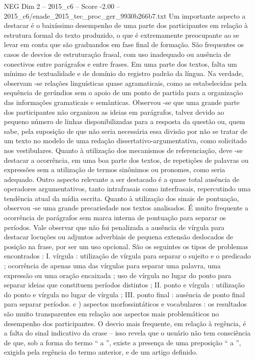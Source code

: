 \begin{textsample}{NEG Dim 2 – 2015\_c6 – Score -2.00 – 2015\_c6/enade\_2015\_tec\_proc\_ger\_9930b266b7.txt}
Um importante aspecto a destacar é o baixíssimo desempenho de uma parte dos participantes em relação à estrutura formal do texto produzido, o que é extremamente preocupante ao se levar em conta que são graduandos em fase final de formação.
São frequentes os casos de desvios de estruturação frasal, com uso inadequado ou ausência de conectivos entre parágrafos e entre frases.
Em uma parte dos textos, falta um mínimo de textualidade e de domínio do registro padrão da língua.
Na verdade, observam -se relações linguísticas quase agramaticais, como as estabelecidas pela sequência de gerúndios sem o apoio de um ponto de partida para a organização das informações gramaticais e semânticas.
Observou -se que uma grande parte dos participantes não organizou as ideias em parágrafos, talvez devido ao pequeno número de linhas disponibilizadas para a resposta da questão ou, quem sabe, pela suposição de que não seria necessária essa divisão por não se tratar de um texto no modelo de uma redação dissertativo-argumentativa, como solicitado nos vestibulares.
Quanto à utilização dos mecanismos de referenciação, deve -se destacar a ocorrência, em uma boa parte dos textos, de repetições de palavras ou expressões sem a utilização de termos sinônimos ou pronomes, como seria adequado.
Outro aspecto relevante a ser destacado é a quase total ausência de operadores argumentativos, tanto intrafrasais como interfrasais, repercutindo uma tendência atual da mídia escrita.
Quanto à utilização dos sinais de pontuação, observou -se uma grande precariedade nos textos analisados.
É muito frequente a ocorrência de parágrafos sem marca interna de pontuação para separar os períodos.
Vale observar que não foi penalizada a ausência de vírgula para destacar locuções ou adjuntos adverbiais de pequena extensão deslocados de posição na frase, por ser um uso opcional.
São os seguintes os tipos de problemas encontrados : I. vírgula : utilização de vírgula para separar o sujeito e o predicado ; ocorrência de apenas uma das vírgulas para separar uma palavra, uma expressão ou uma oração encaixada ; uso de vírgula no lugar do ponto para separar ideias que constituem períodos distintos ; II. ponto e vírgula : utilização do ponto e vírgula no lugar de vírgula ; III. ponto final : ausência de ponto final para separar períodos. c ) aspectos morfossintáticos e vocabulares : os resultados são muito transparentes em relação aos aspectos mais problemáticos no desempenho dos participantes.
O desvio mais frequente, em relação à regência, é a falta do sinal indicativo da crase – isso revela que o usuário não tem consciência de que, sob a forma do termo “ a ”, existe a presença de uma preposição “ a ”, exigida pela regência do termo anterior, e de um artigo definido.

\end{textsample}
